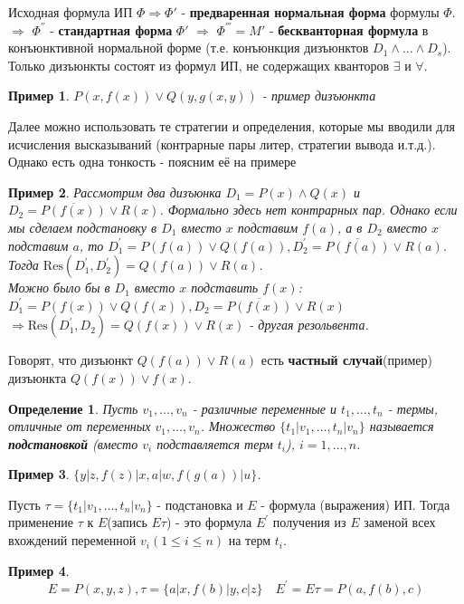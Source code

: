 \documentclass{article}
\newtheorem{example}{Пример}
\newtheorem{definition}{Определение}
\numberwithin{example}{section}
\numberwithin{question}{section}
\numberwithin{Remark}{section}
\numberwithin{theorem}{section}
\numberwithin{definition}{section}
\numberwithin{proposition}{section}
\begin{document}
Исходная формула ИП $\Phi\Rightarrow\Phi'$ - \textbf{предваренная нормальная форма} формулы $\Phi$. $\Rightarrow$ $\Phi^{''}$ - \textbf{стандартная форма} $\Phi'$ $\Rightarrow$ $\Phi^{'''}=M'$ - \textbf{бескванторная формула} в конъюнктивной нормальной форме (т.е. конъюнкция дизъюнктов $D_1\wedge \ldots\wedge D_s$). Только дизъюнкты состоят из формул ИП, не содержащих кванторов $\exists$ и $\forall$.
\begin{example}
	$P(x,f(x))\vee Q(y,g(x,y))$ - пример дизъюнкта
\end{example} 
Далее можно использовать те стратегии и определения, которые мы вводили для исчисления высказываний (контрарные пары литер, стратегии вывода и.т.д.). Однако есть одна тонкость - поясним её на примере
\begin{example}
	Рассмотрим два дизъюнка $D_1=P(x)\wedge Q(x)$ и $D_2=\overline{P(f(x))}\vee R(x)$. Формально здесь нет контрарных пар. Однако если мы сделаем подстановку в $D_1$ вместо $x$ подставим $f(a)$, а в $D_2$ вместо $x$ подставим $a$, то $D_1^{'}=P(f(a))\vee Q(f(a)),D_2^{'}=\overline{P(f(a))}\vee R(a)$. Тогда $\mathrm{Res}(D_1^{'},D_2^{'})=Q(f(a))\vee R(a)$. \\
	Можно было бы в $D_1$ вместо $x$ подставить $f(x)$: $D_1^{'}=P(f(x))\vee Q(f(x)),D_2=\overline{P(f(x))}\vee R(x)$ $\Rightarrow\mathrm{Res}(D_1^{'},D_2)=Q(f(x))\vee R(x)$ - другая резольвента.
\end{example}
Говорят, что дизъюнкт $Q(f(a))\vee R(a)$ есть \textbf{частный случай}(пример) дизъюнкта $Q(f(x))\vee f(x)$.
\begin{definition}
	Пусть $v_1,\ldots,v_n$ - различные переменные и $t_1,\ldots,t_n$ - термы, отличные от переменных $v_1,\ldots,v_n$. Множество $\{t_1|v_1,\ldots,t_n|v_n \}$ называется \textbf{подстановкой} (вместо $v_i$ подставляется терм $t_i$), $i=1,\ldots,n$.
\end{definition}
\begin{example}
	$\{ y|z,f(z)|x,a|w,f(g(a))|u\}$.
\end{example}
Пусть $\tau=\{t_1|v_1,\ldots,t_n|v_n \}$ - подстановка и $E$ - формула (выражения) ИП. Тогда применение $\tau$ к $E$(запись $E\tau$) - это формула $E^{'}$ получения  из $E$ заменой всех вхождений переменной $v_i(1\leqslant i\leqslant n)$ на терм $t_i$.
\begin{example}
	\begin{equation*}
	E=P(x,y,z),\tau=\{a|x,f(b)|y,c|z \}\quad E^{'}=E\tau = P(a,f(b),c)
	\end{equation*}
\end{example}
\end{document}
